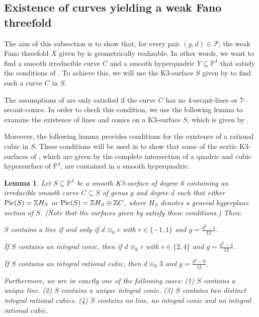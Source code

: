 \documentclass[english,11pt,reqno]{amsart}
\newcommand{\sub}{\subseteq}
\newcommand{\Pfour}{\mathbb{P}^4}
\newcommand{\Z}{\mathbb{Z}}
\newcommand{\Pic}{\textup{Pic}}
\newtheorem{lem}[thm]{Lemma}
\begin{document}
\subsection{Existence of curves yielding a weak Fano threefold} \label{subsection:existence}
%
%
%
The aim of this subsection is to show that, for every pair $(g,d)\in \mathcal{P}$, the weak Fano threefold $X$ given by  is geometrically realizable. In other words, we want to find a smooth irreducible curve $C$ and a smooth hyperquadric $Y \sub \Pfour$ that satisfy the conditions of . To achieve this, we will use the K3-surface $S$ given by  to find such a curve $C$ in $S$. \par 
The assumptions of  are only satisfied if the curve $C$ has no 4-secant-lines or 7-secant-conics. In order to check this condition, we use the following lemma to examine the existence of lines and conics on a K3-surface $S$, which is given by . \par 
Moreover, the following lemma provides conditions for the existence of a rational cubic in $S$. These conditions will be used in  to show that some of the sextic K3-surfaces of , which are given by the complete intersection of a quadric and cubic hypersurface of $\Pfour$, are contained in a smooth hyperquadric.
%
\begin{lem} \label{lem:line_conic_cubic_in_K3}
Let $S\sub \Pfour$ be a smooth K3-surface of degree 6 containing an irreducible smooth curve $C\sub S$ of genus $g$ and degree $d$ such that either $\Pic(S)= \Z H_S$ or $\Pic(S)=\Z H_S \oplus \Z C$, where $H_S$ denotes a general hyperplane section of $S$. (Note that the surfaces given by  satisfy these conditions.) Then:
\begin{enumlem}
\item $S$ contains a line if and only if $d\equiv_6 r$ with $r\in\{-1, 1\}$ and $g = \frac{d^2-1}{12}$. \label{lem:line_in_K3}
\item If $S$ contains an integral conic, then if $d\equiv_6 r$ with $r\in \{2,4\}$ and $g=\frac{d^2-4}{12}$. \label{lem:conic_in_K3}
\item If $S$ contains an integral rational cubic, then $d\equiv_6 3$ and $g=\frac{d^2-9}{12}$. \label{lem:cubic_in_K3}
\end{enumlem}
Furthermore, we are in exactly one of the following cases: (1) $S$ contains a unique line. (2) $S$ contains a unique integral conic. (3) $S$ contains two distinct integral rational cubics. (4) $S$ contains no line, no integral conic and no integral rational cubic.
\end{lem}
\end{document}

